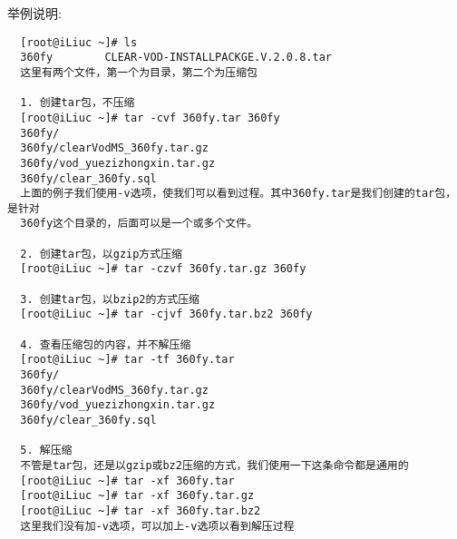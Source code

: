 举例说明:

\small{
\begin{verbatim}
  [root@iLiuc ~]# ls
  360fy        CLEAR-VOD-INSTALLPACKGE.V.2.0.8.tar
  这里有两个文件，第一个为目录，第二个为压缩包

  1. 创建tar包，不压缩
  [root@iLiuc ~]# tar -cvf 360fy.tar 360fy
  360fy/
  360fy/clearVodMS_360fy.tar.gz
  360fy/vod_yuezizhongxin.tar.gz
  360fy/clear_360fy.sql
  上面的例子我们使用-v选项，使我们可以看到过程。其中360fy.tar是我们创建的tar包，是针对
  360fy这个目录的，后面可以是一个或多个文件。

  2. 创建tar包，以gzip方式压缩
  [root@iLiuc ~]# tar -czvf 360fy.tar.gz 360fy

  3. 创建tar包，以bzip2的方式压缩
  [root@iLiuc ~]# tar -cjvf 360fy.tar.bz2 360fy

  4. 查看压缩包的内容，并不解压缩
  [root@iLiuc ~]# tar -tf 360fy.tar
  360fy/
  360fy/clearVodMS_360fy.tar.gz
  360fy/vod_yuezizhongxin.tar.gz
  360fy/clear_360fy.sql

  5. 解压缩
  不管是tar包，还是以gzip或bz2压缩的方式，我们使用一下这条命令都是通用的
  [root@iLiuc ~]# tar -xf 360fy.tar
  [root@iLiuc ~]# tar -xf 360fy.tar.gz
  [root@iLiuc ~]# tar -xf 360fy.tar.bz2
  这里我们没有加-v选项，可以加上-v选项以看到解压过程
\end{verbatim}
}
\normalsize
